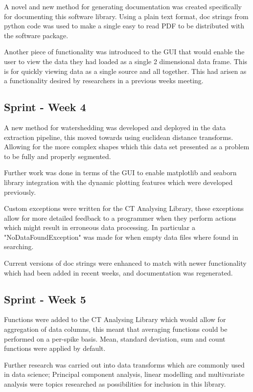 \documentclass[11pt]{report}
\begin{document}
A novel and new method for generating documentation was created specifically for documenting this software library. Using a plain text format, doc strings from python code was used to make a single easy to read PDF to be distributed with the software package.

Another piece of functionality was introduced to the GUI that would enable the user to view the data they had loaded as a single 2 dimensional data frame. This is for quickly viewing data as a single source and all together. This had arisen as a functionality desired by researchers in a previous weeks meeting.

\subsection{Sprint - Week 4}
\label{sec:orgeac5a6d}
A new method for watershedding was developed and deployed in the data extraction pipeline, this moved towards using euclidean distance transforms. Allowing for the more complex shapes which this data set presented as a problem to be fully and properly segmented.

Further work was done in terms of the GUI to enable matplotlib and seaborn library integration with the dynamic plotting features which were developed previously.

Custom exceptions were written for the CT Analysing Library, these exceptions allow for more detailed feedback to a programmer when they perform actions which might result in erroneous data processing. In particular a "NoDataFoundException" was made for when empty data files where found in searching.

Current versions of doc strings were enhanced to match with newer functionality which had been added in recent weeks, and documentation was regenerated.

\subsection{Sprint - Week 5}
\label{sec:org0feea5b}
Functions were added to the CT Analysing Library which would allow for aggregation of data columns, this meant that averaging functions could be performed on a per-spike basis. Mean, standard deviation, sum and count functions were applied by default.

Further research was carried out into data transforms which are commonly used in data science; Principal component analysis, linear modelling and multivariate analysis were topics researched as possibilities for inclusion in this library.
\end{document}
